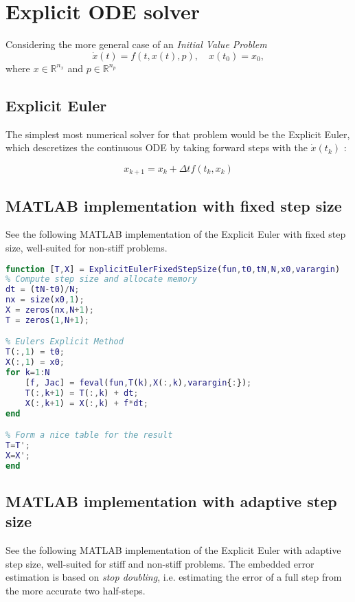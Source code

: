 \section{Explicit ODE solver}
Considering the more general case of an \textit{Initial Value Problem}
$$
\dot{x}(t)=f(t, x(t), p), \quad x\left(t_{0}\right)=x_{0},
$$
where $x \in \mathbb{R}^{n_{x}}$ and $p \in \mathbb{R}^{n_{p}}$

\subsection{Explicit Euler}
The simplest most numerical solver for that problem would be the Explicit Euler, which descretizes the continuous ODE by taking forward steps with the $\dot{x}(t_k)$ \cite{JrgensenScientificEquations}:

\begin{equation}
    x_{k+1}=x_{k}+\Delta t f\left(t_{k}, x_{k}\right)
\end{equation}

\subsection{MATLAB implementation with fixed step size}
See the following MATLAB implementation of the Explicit Euler with fixed step size, well-suited for non-stiff problems.

\begin{adjustwidth*}{0cm}{-0.4cm}
\begin{lstlisting}[language=Matlab,caption=Explicit Euler (fixed step size), label=ExplicitEulerFixie]
function [T,X] = ExplicitEulerFixedStepSize(fun,t0,tN,N,x0,varargin)
% Compute step size and allocate memory
dt = (tN-t0)/N;
nx = size(x0,1);
X = zeros(nx,N+1);
T = zeros(1,N+1);

% Eulers Explicit Method
T(:,1) = t0;
X(:,1) = x0;
for k=1:N
    [f, Jac] = feval(fun,T(k),X(:,k),varargin{:});
    T(:,k+1) = T(:,k) + dt;
    X(:,k+1) = X(:,k) + f*dt;
end

% Form a nice table for the result
T=T';
X=X';
end
\end{lstlisting}
\end{adjustwidth*}

\subsection{MATLAB implementation with adaptive step size}

See the following MATLAB implementation of the Explicit Euler with adaptive step size, well-suited for stiff and non-stiff problems. The embedded error estimation is based on \textit{stop doubling}, i.e. estimating the error of a full step from the more accurate two half-steps.

